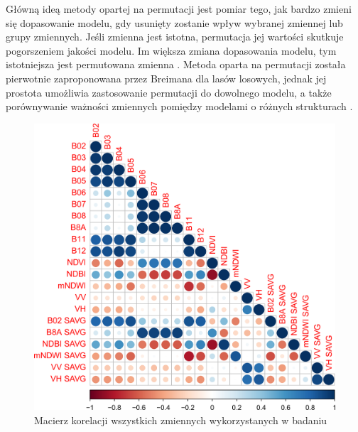 \documentclass{amuthesis}
\begin{document}
Główną ideą metody opartej na permutacji jest pomiar tego, jak bardzo
zmieni się dopasowanie modelu, gdy usunięty zostanie wpływ wybranej
zmiennej lub grupy zmiennych. Jeśli zmienna jest istotna, permutacja jej
wartości skutkuje pogorszeniem jakości modelu. Im większa zmiana
dopasowania modelu, tym istotniejsza jest permutowana zmienna
\autocite{biecek_2021_model_analysis}. Metoda oparta na permutacji
została pierwotnie zaproponowana przez Breimana
\autocite*{breiman_2001_rf} dla lasów losowych, jednak jej prostota
umożliwia zastosowanie permutacji do dowolnego modelu, a także
porównywanie ważności zmiennych pomiędzy modelami o różnych strukturach
\autocite{biecek_2021_model_analysis}.

\begin{figure}[t]

{\centering \includegraphics[width=1\textwidth,height=\textheight]{figures/corrplot1.png}

}

\caption{\label{fig-variables-correlation}Macierz korelacji wszystkich
zmiennych wykorzystanych w badaniu}

\end{figure}
\end{document}
